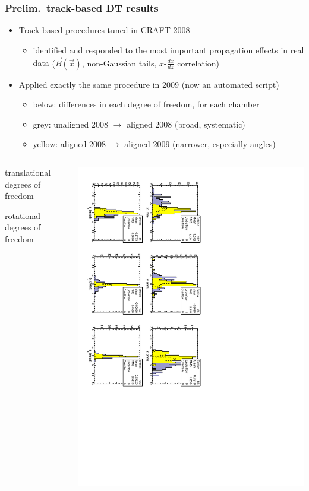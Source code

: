 \documentclass[compress]{beamer}
\begin{document}
\begin{frame}
\frametitle{Prelim.\ track-based DT results}

\begin{itemize}
\item Track-based procedures tuned in CRAFT-2008
\begin{itemize}
\item identified and responded to the most important propagation
  effects in real data {\scriptsize ($\vec{B}(\vec{x})$, non-Gaussian tails, $x$-$\frac{dx}{dz}$ correlation)}
\end{itemize}
\item Applied exactly the same procedure in 2009 {\scriptsize (now an automated script)}
\begin{itemize}
\item below: differences in each degree of freedom, for each chamber
\item grey: unaligned 2008 $\to$ aligned 2008 {\scriptsize (broad, systematic)}
\item yellow: aligned 2008 $\to$ aligned 2009 {\scriptsize (narrower, especially angles)}
\end{itemize}
\end{itemize}

\begin{columns}
\begin{center}
translational degrees of freedom

\vspace{0.75 cm}
rotational degrees of freedom

\vspace{0.5 cm}
\mbox{ }
\end{center}
\includegraphics[height=\linewidth, angle=90]{v4_2008_2009.pdf}
\end{columns}
\end{frame}
\end{document}
